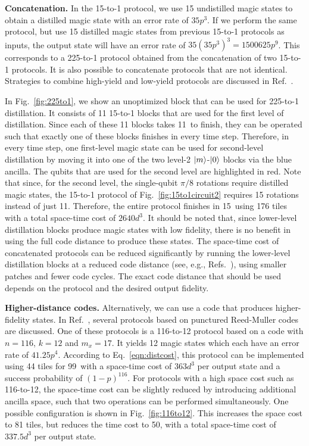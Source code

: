 \documentclass[prx,aps,letterpaper,twocolumn,allowfontchageintitle=true,accepted=2019-02-01]{quantumarticle}
\begin{document}
\textbf{Concatenation.} In the 15-to-1 protocol, we use 15 undistilled magic states to obtain a distilled magic state with an error rate of $35p^3$. If we perform the same protocol, but use 15 distilled magic states from previous 15-to-1 protocols as inputs, the output state will have an error rate of $35(35p^3)^3 = 1500625p^9$. This corresponds to a 225-to-1 protocol obtained from the concatenation of two 15-to-1 protocols. It is also possible to concatenate protocols that are not identical. Strategies to combine high-yield and low-yield protocols are discussed in Ref.~\cite{Bravyi2012}.

In Fig.~\ref{fig:225to1}, we show an unoptimized block that can be used for 225-to-1 distillation. It consists of 11 15-to-1 blocks that are used for the first level of distillation. Since each of these 11 blocks takes 11\clock \ to finish, they can be operated such that exactly one of these blocks finishes in every time step. Therefore, in every time step, one first-level magic state can be used for second-level distillation by moving it into one of the two level-2 $\ket{m}$-$\ket{0}$ blocks via the blue ancilla. The qubits that are used for the second level are highlighted in red. Note that since, for the second level, the single-qubit $\pi/8$ rotations require distilled magic states, the 15-to-1 protocol of Fig.~\ref{fig:15to1circuit2} requires 15 rotations instead of just 11. Therefore, the entire protocol finishes in 15\clock \ using 176 tiles with a total space-time cost of $2640d^3$. It should be noted that, since lower-level distillation blocks produce magic states with low fidelity, there is no benefit in using the full code distance to produce these states. The space-time cost of concatenated protocols can be reduced significantly by running the lower-level distillation blocks at a reduced code distance (see, e.g., Refs.~\cite{Fowler2018,Gidney2018a}), using smaller patches and fewer code cycles. The exact code distance that should be used depends on the protocol and the desired output fidelity.

\textbf{Higher-distance codes.} Alternatively, we can use a code that produces higher-fidelity states. In Ref.~\cite{Haah2018}, several protocols based on punctured Reed-Muller codes are discussed. One of these protocols is a 116-to-12 protocol based on a code with $n=116$, $k=12$ and $m_x = 17$. It yields 12 magic states which each have an error rate of  $41.25p^4$. According to Eq.~\eqref{eqn:distcost}, this protocol can be implemented using 44 tiles  for 99\clock \ with a space-time cost of $363d^3$ per output state and a success probability of $(1-p)^{116}$. For protocols with a high space cost such as 116-to-12, the space-time cost can be slightly reduced by introducing additional ancilla space, such that two operations can be performed simultaneously. One possible configuration is shown in Fig.~\ref{fig:116to12}. This increases the space cost to 81 tiles, but reduces the time cost to 50\clock, with a total space-time cost of $337.5d^3$ per output state.
\end{document}
